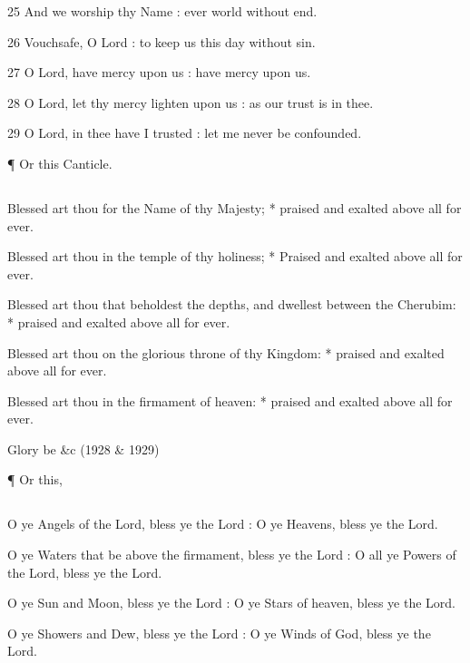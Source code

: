 25 And we worship thy Name : ever world without end.

26 Vouchsafe, O Lord : to keep us this day without sin.

27 O Lord, have mercy upon us : have mercy upon us.

28 O Lord, let thy mercy lighten upon us : as our trust is in thee.

29 O Lord, in thee have I trusted : let me never be confounded.

¶ Or this Canticle.

\subsection{}

Blessed art thou for the Name of thy Majesty; * praised and exalted above all for ever.

Blessed art thou in the temple of thy holiness; * Praised and exalted above all for ever.

Blessed art thou that beholdest the depths, and dwellest between the Cherubim: * praised and exalted above all for ever.

Blessed art thou on the glorious throne of thy Kingdom: * praised and exalted above all for ever.

Blessed art thou in the firmament of heaven: * praised and exalted above all for ever.

Glory be \&c (1928 \& 1929)

    ¶ Or this,
\subsection{}

    

O ye Angels of the Lord, bless ye the Lord : O ye Heavens, bless ye the Lord.

O ye Waters that be above the firmament, bless ye the Lord : O all ye Powers of the Lord, bless ye the Lord.

O ye Sun and Moon, bless ye the Lord : O ye Stars of heaven, bless ye the Lord.

O ye Showers and Dew, bless ye the Lord : O ye Winds of God, bless ye the Lord.

